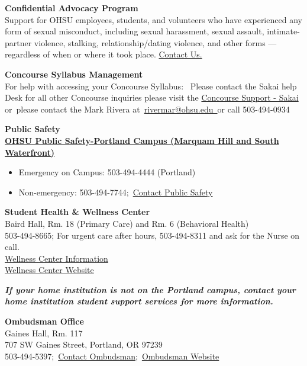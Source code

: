 \documentclass[
  letterpaper,
  DIV=11,
  numbers=noendperiod]{scrartcl}
\begin{document}
\textbf{Confidential Advocacy Program\\
}Support for OHSU employees, students, and volunteers who have
experienced any form of sexual misconduct, including sexual harassment,
sexual assault, intimate-partner violence, stalking, relationship/dating
violence, and other forms --- regardless of when or where it took place.
\href{https://www.ohsu.edu/confidential-advocacy-program}{Contact Us.}

\textbf{Concourse Syllabus Management\\
}For help with accessing your Concourse Syllabus:~ Please contact the
Sakai help Desk for all other Concourse inquiries please visit the
\href{https://sakai.ohsu.edu/portal/site/concourse-syllabus-support}{Concourse
Support - Sakai} or~please contact the Mark Rivera
at~\href{mailto:rivermar@ohsu.edu}{rivermar@ohsu.edu~}or call
503-494-0934

\textbf{Public Safety\\
\href{https://www.ohsu.edu/xd/about/services/public-safety/}{OHSU Public
Safety-Portland Campus (Marquam Hill and South Waterfront)}}

\begin{itemize}
\item
  Emergency on Campus: 503-494-4444 (Portland)
\item
  Non-emergency: 503-494-7744;~\href{mailto:pubsafe@ohsu.edu}{Contact
  Public Safety}
\end{itemize}

\textbf{Student Health \& Wellness Center}~\\
Baird Hall, Rm. 18 (Primary Care) and Rm. 6 (Behavioral Health)\\
503-494-8665; For urgent care after hours, 503-494-8311 and ask for the
Nurse on call.\\
\href{mailto:SHW@ohsu.edu}{Wellness Center Information}~~\\
\href{http://www.ohsu.edu/xd/education/student-services/joseph-trainer-health-wellness-center/}{Wellness
Center Website}

\textbf{\emph{If your home institution is not on the Portland campus,
contact your home institution student support services for more
information.}}

\textbf{Ombudsman Office}\\
Gaines Hall, Rm. 117\\
707 SW Gaines Street, Portland, OR 97239\\
503-494-5397;~\href{mailto:graybill@ohsu.edu}{Contact
Ombudsman};~\href{https://www.ohsu.edu/xd/about/services/ombudsman/}{Ombudsman
Website}
\end{document}

